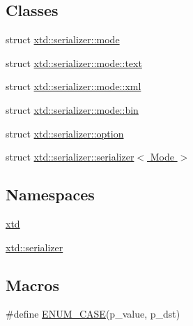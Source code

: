 \subsection*{Classes}
\begin{DoxyCompactItemize}
\item 
struct \hyperlink{structxtd_1_1serializer_1_1mode}{xtd\+::serializer\+::mode}
\item 
struct \hyperlink{structxtd_1_1serializer_1_1mode_1_1text}{xtd\+::serializer\+::mode\+::text}
\item 
struct \hyperlink{structxtd_1_1serializer_1_1mode_1_1xml}{xtd\+::serializer\+::mode\+::xml}
\item 
struct \hyperlink{structxtd_1_1serializer_1_1mode_1_1bin}{xtd\+::serializer\+::mode\+::bin}
\item 
struct \hyperlink{structxtd_1_1serializer_1_1option}{xtd\+::serializer\+::option}
\item 
struct \hyperlink{structxtd_1_1serializer_1_1serializer}{xtd\+::serializer\+::serializer$<$ Mode $>$}
\end{DoxyCompactItemize}
\subsection*{Namespaces}
\begin{DoxyCompactItemize}
\item 
 \hyperlink{namespacextd}{xtd}
\item 
 \hyperlink{namespacextd_1_1serializer}{xtd\+::serializer}
\end{DoxyCompactItemize}
\subsection*{Macros}
\begin{DoxyCompactItemize}
\item 
\#define \hyperlink{serializer_8hh_a54ebd30f6967d7f47176460bf889311b}{E\+N\+U\+M\+\_\+\+C\+A\+SE}(p\+\_\+value,  p\+\_\+dst)
\end{DoxyCompactItemize}
